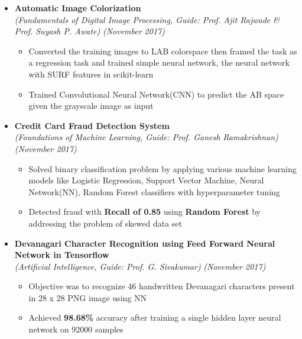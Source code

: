 \documentclass[a4paper,10pt]{article}
\newcommand{\isep}{-2 pt}
\begin{document}
\begin{itemize}
\item \textbf{Automatic Image Colorization} \\
    {\emph{(Fundamentals of Digital Image Processing, Guide: Prof. Ajit Rajwade \& Prof. Suyash P. Awate)}} \hfill {\emph{(November 2017)}}
    \\ [-0.6cm]
    \begin{itemize}\itemsep \isep
    \item Converted the training images to LAB colorspace then framed the task as a regression task and trained simple neural network, the neural network with SURF features in scikit-learn
	\item Trained Convolutional Neural Network(CNN) to predict the AB space given the grayscale image as input
\end{itemize}

\item \textbf{Credit Card Fraud Detection System}\\ {\emph{(Foundations of Machine Learning, Guide: Prof. Ganesh Ramakrishnan)}} \hfill {\emph{(November 2017)}}
\\[-0.6cm]
    \begin{itemize}\itemsep \isep
        \item Solved binary classification problem by applying various machine learning models like Logistic Regression, Support Vector Machine, Neural Network(NN), Random Forest classifiers with hyperparameter tuning
		\item Detected fraud with \textbf{Recall of 0.85} using \textbf{Random Forest} by addressing the problem of skewed data set 
    \end{itemize}

\item \textbf{Devanagari Character Recognition using Feed Forward Neural Network in Tensorflow} \\ {\emph{(Artificial Intelligence, Guide: Prof. G. Sivakumar)}} \hfill {\emph{(November 2017)}}
    \\ [-0.6cm]
    \begin{itemize}\itemsep \isep
    \item Objective was to recognize 46 handwritten Devanagari characters present in 28 x 28 PNG image using NN
    \item Achieved \textbf{98.68\%} accuracy after training a single hidden layer neural network on 92000 samples
    \end{itemize}
\end{itemize}
\end{document}
